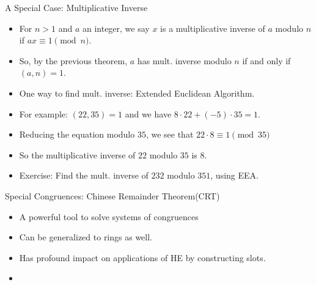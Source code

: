 \documentclass[ %
 usenames,dvipsnames,
aspectratio=169,11pt ]{beamer}
\newenvironment{stepitemize}{\begin{itemize}[<+->]}{\end{itemize} }
\begin{document}
\begin{frame}{A Special Case: Multiplicative Inverse}
\begin{stepitemize}
\item For $n>1$ and $a$ an integer, we say $x$ is a multiplicative inverse of $a$ modulo $n$ if $ax\equiv  1 \pmod{n}$.
\item So, by the previous theorem, $a$ has mult. inverse modulo $n$ if and only if $(a,n)=1$.
\item One way to find mult. inverse: Extended Euclidean Algorithm.
\item For example: $(22,35)=1$ and we have $8\cdot 22 +(-5)\cdot 35=1$.
\item Reducing the equation modulo $35$, we see that $22\cdot 8 \equiv 1 \pmod{35}$
\item So the multiplicative inverse of $22$ modulo $35$ is $8$.
\item Exercise: Find the mult. inverse of $232$ modulo $351$, using EEA.
\end{stepitemize}

\end{frame}
\begin{frame}{Special Congruences: Chinese Remainder Theorem(CRT)}
\begin{stepitemize}
\item A powerful tool to solve systems of congruences
\item Can be generalized to rings as well.
\item Has profound impact on applications of HE by constructing slots.

\medskip
\item[]
\begin{center}
\end{center}
\end{stepitemize}
\end{frame}
\end{document}
